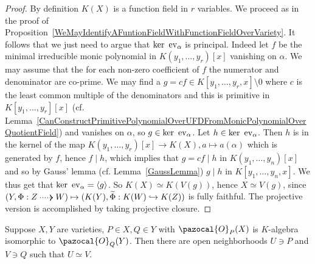     \begin{proof}
        By definition $K(X)$ is a function field in $r$ variables. We proceed as in the proof of Proposition~\ref{WeMayIdentifyAFuntionFieldWithFunctionFieldOverVariety}. It follows that we just need to argue that $\ker \ \mathrm{ev}_\alpha$ is principal. Indeed let $f$ be the minimal irreducible monic polynomial in $K(y_1,\dots,y_r)[x]$ vanishing on $\alpha$. We may assume that the for each non-zero coefficient of $f$ the numerator and denominator are co-prime. We may find a $g=cf\in K[y_1,\dots,y_r,x]\setminus 0$ where $c$ is the least common multiple of the denominators and this is primitive in $K[y_1,\dots,y_r][x]$ (cf. Lemma~\ref{CanConstructPrimitivePolynomialOverUFDFromMonicPolynomialOverQuotientField}) and vanishes on $\alpha$, so $g\in \ker\ \mathrm{ev}_\alpha$. Let $h\in \ker\ \mathrm{ev}_\alpha$. Then $h$ is in the kernel of the map $K(y_1,\dots,y_r)[x]\rightarrow K(X), a\mapsto a(\alpha)$ which is generated by $f$, hence $f\mid h$, which implies that $g=cf \mid h$ in $K(y_1,\dots,y_n)[x]$ and so by Gauss' lemma (cf. Lemma~\ref{GaussLemma}) $g\mid h$ in  $K[y_1,\dots,y_n,x].$ We thus get that $\ker\ \mathrm{ev}_\alpha = \langle g\rangle$. So $K(X)\simeq K(V(g))$, hence $X\simeq V(g)$, since $(Y,\Phi : Z\dottedarrow W)\mapsto (K(Y), \widetilde{\Phi} : K(W) \hookrightarrow K(Z))$ is fully faithful. The projective version is accomplished by taking projective closure. 
    \end{proof}
    \begin{proposition}
        Suppose $X,Y$ are varieties, $P\in X, Q\in Y$ with $\pazocal{O}_P(X)$ is $K$-algebra isomorphic to $\pazocal{O}_Q(Y)$. Then there are open neighborhoods $U\ni P$ and $V\ni Q$ such that $U\simeq V$.
    \end{proposition}
